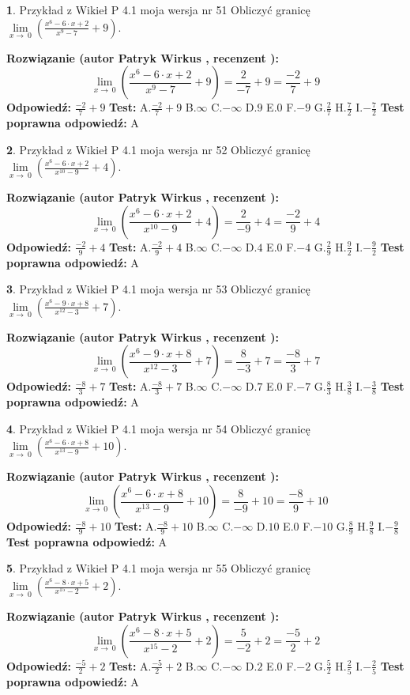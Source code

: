 \documentclass[12pt, a4paper]{article}
\theoremstyle{definition} %
\newtheorem{zad}{}
\newcommand{\zadStart}[1]{\begin{zad}#1\newline}
\newcommand{\zadStop}{\end{zad}}
\newcommand{\rozwStart}[2]{\noindent \textbf{Rozwiązanie (autor #1 , recenzent #2): }\newline}
\newcommand{\rozwStop}{\newline}
\newcommand{\odpStart}{\noindent \textbf{Odpowiedź:}\newline}
\newcommand{\odpStop}{\newline}
\newcommand{\testStart}{\noindent \textbf{Test:}\newline}
\newcommand{\testStop}{\newline}
\newcommand{\kluczStart}{\noindent \textbf{Test poprawna odpowiedź:}\newline}
\newcommand{\kluczStop}{\newline}
\begin{document}
\zadStart{Przykład z Wikieł P 4.1 moja wersja nr 51}
Obliczyć granicę $\lim\limits_{x\to\ 0}(\frac{x^{6}-6 \cdot x +2}{x^{9}-7}+9)$.
\zadStop
\rozwStart{Patryk Wirkus}{}
$$\lim\limits_{x\to\ 0}(\frac{x^{6}-6 \cdot x +2}{x^{9}-7}+9)=\frac{2}{-7}+9=\frac{-2}{7}+9$$
\rozwStop
\odpStart
$\frac{-2}{7}+9$
\odpStop
\testStart
A.$\frac{-2}{7}+9$
B.$\infty$
C.$-\infty$
D.$9$
E.$0$
F.$-9$
G.$\frac{2}{7}$
H.$\frac{7}{2}$
I.$-\frac{7}{2}$
\testStop
\kluczStart
A
\kluczStop



\zadStart{Przykład z Wikieł P 4.1 moja wersja nr 52}
Obliczyć granicę $\lim\limits_{x\to\ 0}(\frac{x^{6}-6 \cdot x +2}{x^{10}-9}+4)$.
\zadStop
\rozwStart{Patryk Wirkus}{}
$$\lim\limits_{x\to\ 0}(\frac{x^{6}-6 \cdot x +2}{x^{10}-9}+4)=\frac{2}{-9}+4=\frac{-2}{9}+4$$
\rozwStop
\odpStart
$\frac{-2}{9}+4$
\odpStop
\testStart
A.$\frac{-2}{9}+4$
B.$\infty$
C.$-\infty$
D.$4$
E.$0$
F.$-4$
G.$\frac{2}{9}$
H.$\frac{9}{2}$
I.$-\frac{9}{2}$
\testStop
\kluczStart
A
\kluczStop



\zadStart{Przykład z Wikieł P 4.1 moja wersja nr 53}
Obliczyć granicę $\lim\limits_{x\to\ 0}(\frac{x^{6}-9 \cdot x +8}{x^{12}-3}+7)$.
\zadStop
\rozwStart{Patryk Wirkus}{}
$$\lim\limits_{x\to\ 0}(\frac{x^{6}-9 \cdot x +8}{x^{12}-3}+7)=\frac{8}{-3}+7=\frac{-8}{3}+7$$
\rozwStop
\odpStart
$\frac{-8}{3}+7$
\odpStop
\testStart
A.$\frac{-8}{3}+7$
B.$\infty$
C.$-\infty$
D.$7$
E.$0$
F.$-7$
G.$\frac{8}{3}$
H.$\frac{3}{8}$
I.$-\frac{3}{8}$
\testStop
\kluczStart
A
\kluczStop



\zadStart{Przykład z Wikieł P 4.1 moja wersja nr 54}
Obliczyć granicę $\lim\limits_{x\to\ 0}(\frac{x^{6}-6 \cdot x +8}{x^{13}-9}+10)$.
\zadStop
\rozwStart{Patryk Wirkus}{}
$$\lim\limits_{x\to\ 0}(\frac{x^{6}-6 \cdot x +8}{x^{13}-9}+10)=\frac{8}{-9}+10=\frac{-8}{9}+10$$
\rozwStop
\odpStart
$\frac{-8}{9}+10$
\odpStop
\testStart
A.$\frac{-8}{9}+10$
B.$\infty$
C.$-\infty$
D.$10$
E.$0$
F.$-10$
G.$\frac{8}{9}$
H.$\frac{9}{8}$
I.$-\frac{9}{8}$
\testStop
\kluczStart
A
\kluczStop



\zadStart{Przykład z Wikieł P 4.1 moja wersja nr 55}
Obliczyć granicę $\lim\limits_{x\to\ 0}(\frac{x^{6}-8 \cdot x +5}{x^{15}-2}+2)$.
\zadStop
\rozwStart{Patryk Wirkus}{}
$$\lim\limits_{x\to\ 0}(\frac{x^{6}-8 \cdot x +5}{x^{15}-2}+2)=\frac{5}{-2}+2=\frac{-5}{2}+2$$
\rozwStop
\odpStart
$\frac{-5}{2}+2$
\odpStop
\testStart
A.$\frac{-5}{2}+2$
B.$\infty$
C.$-\infty$
D.$2$
E.$0$
F.$-2$
G.$\frac{5}{2}$
H.$\frac{2}{5}$
I.$-\frac{2}{5}$
\testStop
\kluczStart
A
\kluczStop
\end{document}
